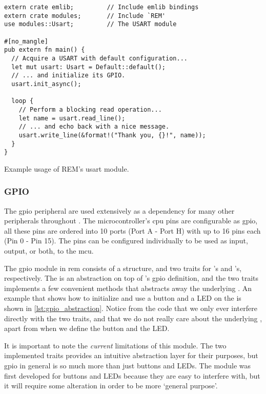 \begin{listing}[H]
  \begin{verbatim}
extern crate emlib;         // Include emlib bindings
extern crate modules;       // Include `REM'
use modules::Usart;         // The USART module

#[no_mangle]
pub extern fn main() {
  // Acquire a USART with default configuration...
  let mut usart: Usart = Default::default();
  // ... and initialize its GPIO.
  usart.init_async();

  loop {
    // Perform a blocking read operation...
    let name = usart.read_line();
    // ... and echo back with a nice message.
    usart.write_line(&format!("Thank you, {}!", name));
  }
}
  \end{verbatim}
  \caption{Example usage of \gls{REM}'s \gls{usart} module.}
  \label{lst:usart_abstraction}
\end{listing}

\subsubsection{GPIO} %
\label{ssub:gpio}

The \gls{gpio} peripheral are used extensively as a dependency for many other peripherals throughout {\emlib}.
The microcontroller's \gls{cpu} pins are configurable as \gls{gpio}, all these pins are ordered into 10 ports (Port A - Port H) with up to 16 pins each (Pin 0 - Pin 15).
The pins can be configured individually to be used as input, output, or both, to the \gls{mcu}.

The \gls{gpio} module in \gls{rem} consists of a  structure, and two traits for 's and 's, respectively.
The  is an abstraction on top of {\emlib}'s \gls{gpio} definition, and the two traits implements a few convenient methods that abstracts away the underlying .
An example that shows how to initialize and use a button and a LED on the {\STK} is shown in \autoref{lst:gpio_abstraction}.
Notice from the code that we only ever interfere directly with the two traits, and that we do not really care about the underlying , apart from when we define the button and the LED.

It is important to note the \emph{current} limitations of this module.
The two implemented traits provides an intuitive abstraction layer for their purposes, but \gls{gpio} in general is so much more than just buttons and LEDs.
The module was first developed for buttons and LEDs because they are easy to interfere with, but it will require some alteration in order to be more `general purpose'.

